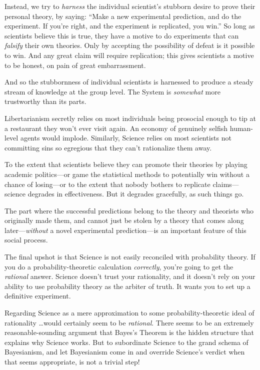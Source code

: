 {
 Instead, we try to \textit{harness} the individual
scientist's stubborn desire to prove their personal
theory, by saying: ``Make a new experimental
prediction, and do the experiment. If you're right, and
the experiment is replicated, you win.'' So long as
scientists believe this is true, they have a motive to do experiments
that can \textit{falsify} their own theories. Only by accepting the
possibility of defeat is it possible to win. And any great claim will
require replication; this gives scientists a motive to be honest, on
pain of great embarrassment.}

{
 And so the stubbornness of individual scientists is harnessed to
produce a steady stream of knowledge at the group level. The System is
\textit{somewhat} more trustworthy than its parts.}

{
 Libertarianism secretly relies on most individuals being prosocial
enough to tip at a restaurant they won't ever visit
again. An economy of genuinely selfish human-level agents would
implode. Similarly, Science relies on most scientists not committing
sins so egregious that they can't rationalize them
away.}

{
 To the extent that scientists believe they can promote their
theories by playing academic politics---or game the statistical methods
to potentially win without a chance of losing---or to the extent that
nobody bothers to replicate claims---science degrades in effectiveness.
But it degrades gracefully, as such things go.}

{
 The part where the successful predictions belong to the theory and
theorists who originally made them, and cannot just be stolen by a
theory that comes along later---\textit{without} a novel experimental
prediction---is an important feature of this social process.}

{
 The final upshot is that Science is not easily reconciled with
probability theory. If you do a probability-theoretic calculation
\textit{correctly}, you're going to get the
\textit{rational} answer. Science doesn't trust your
rationality, and it doesn't rely on your ability to use
probability theory as the arbiter of truth. It wants you to set up a
definitive experiment.}

{
 Regarding Science as a mere approximation to some
probability-theoretic ideal of rationality \ldots would certainly seem
to be \textit{rational}. There seems to be an extremely
reasonable-sounding argument that Bayes's Theorem is
the hidden structure that explains why Science works. But to
subordinate Science to the grand schema of Bayesianism, and let
Bayesianism come in and override Science's verdict when
that seems appropriate, is not a trivial step!}

